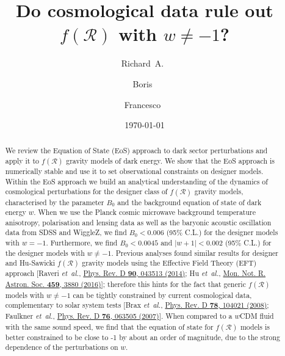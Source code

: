\documentclass[nofootinbib,a4paper,aps,prd,10pt,superscriptaddress,reprint,showkeys,showpacs]{revtex4-1}
\newcommand{\qsubrm}[2]{{#1}_{\scriptscriptstyle{\textrm{#2}}}}
\begin{document}
\title{Do cosmological data rule out \texorpdfstring{$f(\mathcal{R})$}{f(R)} with \texorpdfstring{$w\neq-1$?}{w}}

\author{Richard~A.~}%
\author{Boris~}
\author{Francesco~}

\label{firstpage}

\date{\today}

\begin{abstract}
We review the Equation of State (EoS) approach to dark sector perturbations and apply it to $f(\mathcal{R})$ gravity 
models of dark energy. We show that the EoS approach is numerically stable and use it to set observational constraints 
on designer models. Within the EoS approach we build an analytical understanding of the dynamics of cosmological 
perturbations for the designer class of $f(\mathcal{R})$ gravity models, characterised by the parameter 
$\qsubrm{B}{0}$ and the background equation of state of dark energy $w$. When we use the Planck cosmic microwave 
background temperature anisotropy, polarisation and lensing data as well as the baryonic acoustic oscillation data from 
SDSS and WiggleZ, we find $\qsubrm{B}{0}<0.006$ (95\% C.L.) for the designer models with $w=-1$. Furthermore, we find 
$\qsubrm{B}{0}<0.0045$ and $|w+1|<0.002$ (95\% C.L.) for the designer models with $w\neq -1$. Previous analyses found 
similar results for designer and Hu-Sawicki $f(\mathcal{R})$ gravity models using the Effective Field Theory (EFT) 
approach 
[Raveri {\it et~al.}, \href{https://doi.org/10.1103/PhysRevD.90.043513}{Phys. Rev. D {\bf 90}, 043513 (2014)}; 
Hu {\it et~al.}, \href{https://doi.org/10.1093/mnras/stw775}{Mon. Not. R. Astron. Soc. {\bf 459}, 3880 (2016)}]; 
therefore this hints for the fact that generic $f(\mathcal{R})$ models with $w\neq-1$ can be tightly constrained by 
current cosmological data, complementary to solar system tests 
[Brax {\it et~al.}, \href{https://doi.org/10.1103/PhysRevD.78.104021}{Phys. Rev. D {\bf 78}, 104021 (2008)};
Faulkner {\it et~al.}, \href{https://doi.org/10.1103/PhysRevD.76.063505}{Phys. Rev. D {\bf 76}, 063505 (2007)}]. 
When compared to a $w$CDM fluid with the same sound speed, we find that the equation of state for $f(\mathcal{R})$ 
models is better constrained to be close to -1 by about an order of magnitude, due to the strong dependence of the 
perturbations on $w$.
\end{abstract}
\end{document}
